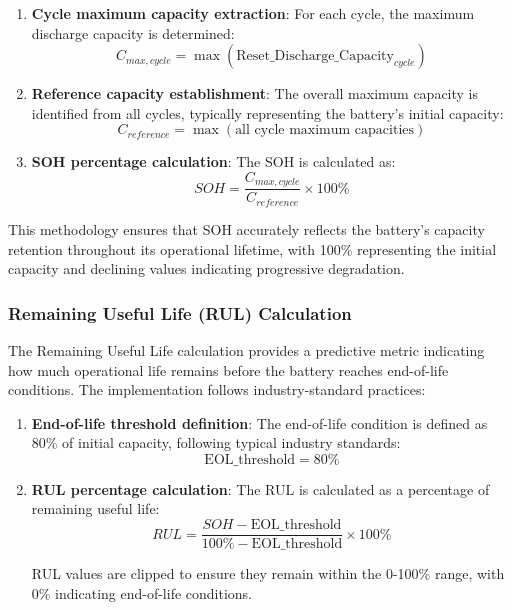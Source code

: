 \begin{enumerate}
    \item \textbf{Cycle maximum capacity extraction}: For each cycle, the maximum discharge capacity is determined:
    \begin{equation}
        C_{max,cycle} = \max(\text{Reset\_Discharge\_Capacity}_{cycle})
    \end{equation}
    
    \item \textbf{Reference capacity establishment}: The overall maximum capacity is identified from all cycles, typically representing the battery's initial capacity:
    \begin{equation}
        C_{reference} = \max(\text{all cycle maximum capacities})
    \end{equation}
    
    \item \textbf{SOH percentage calculation}: The SOH is calculated as:
    \begin{equation}
        SOH = \frac{C_{max,cycle}}{C_{reference}} \times 100\%
    \end{equation}
\end{enumerate}

This methodology ensures that SOH accurately reflects the battery's capacity retention throughout its operational lifetime, with 100\% representing the initial capacity and declining values indicating progressive degradation.

\subsubsection{Remaining Useful Life (RUL) Calculation}
\label{subsubsec:rul_calculation}

The Remaining Useful Life calculation provides a predictive metric indicating how much operational life remains before the battery reaches end-of-life conditions. The implementation follows industry-standard practices:

\begin{enumerate}
    \item \textbf{End-of-life threshold definition}: The end-of-life condition is defined as 80\% of initial capacity, following typical industry standards:
    \begin{equation}
        \text{EOL\_threshold} = 80\%
    \end{equation}
    
    \item \textbf{RUL percentage calculation}: The RUL is calculated as a percentage of remaining useful life:
    \begin{equation}
        RUL = \frac{SOH - \text{EOL\_threshold}}{100\% - \text{EOL\_threshold}} \times 100\%
    \end{equation}
    
    RUL values are clipped to ensure they remain within the 0-100\% range, with 0\% indicating end-of-life conditions.
\end{enumerate}

